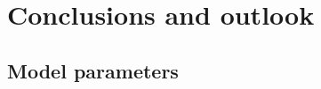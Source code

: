 \documentclass[a4paper,11pt,twoside,onecolumn]{book}
\begin{document}
\frontmatter




%


%


\tableofcontents
\newpage



\mainmatter













\chapter{Conclusions and outlook}
\label{conclusion}
%


\appendix
\begin{landscape}
\chapter{Model parameters}
\label{sec:coefficients}
%
\end{landscape}




\backmatter



\end{document}
